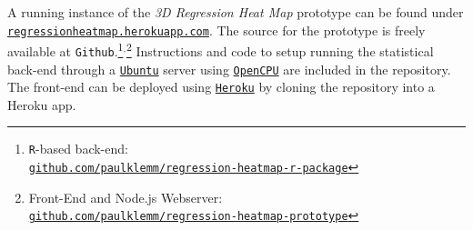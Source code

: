 \documentclass[journal]{style/vgtc} 			          %
\begin{document}
A running instance of the \emph{3D Regression Heat Map} prototype can be found under \href{http://regressionheatmap.herokuapp.com/}{\texttt{regressionheatmap.herokuapp.com}}.
The source for the prototype is freely available at \texttt{Github}.\footnote{\texttt{R}-based back-end: \href{https://github.com/paulklemm/regression-heatmap-r-package}{\\\texttt{github.com/paulklemm/regression-heatmap-r-package}}}$^{,}$\footnote{Front-End and Node.js Webserver: \href{https://github.com/paulklemm/regression-heatmap-prototype}{\texttt{\\github.com/paulklemm/regression-heatmap-prototype}}}
Instructions and code to setup running the statistical back-end through a \href{http://www.ubuntu.com/}{\texttt{Ubuntu}} server using \href{https://www.opencpu.org/}{\texttt{OpenCPU}} are included in the repository.
The front-end can be deployed using \href{https://www.heroku.com/}{\texttt{Heroku}} by cloning the repository into a Heroku app.
\end{document}
